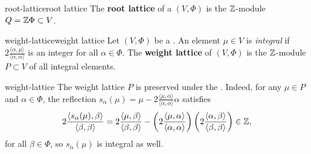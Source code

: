 \begin{topic}{root-lattice}{root lattice}
    The \textbf{root lattice} of a  $(V, \Phi)$ is the $\mathbb{Z}$-module $Q = \mathbb{Z} \Phi \subset V$.
\end{topic}

\begin{topic}{weight-lattice}{weight lattice}
    Let $(V, \Phi)$ be a . An element $\mu \in V$ is \textit{integral} if $2 \frac{\langle \alpha, \mu \rangle}{\langle \alpha, \alpha \rangle}$ is an integer for all $\alpha \in \Phi$. The \textbf{weight lattice} of $(V, \Phi)$ is the $\mathbb{Z}$-module $P \subset V$ of all integral elements.
\end{topic}

\begin{example}{weight-lattice}
    The weight lattice $P$ is preserved under the . Indeed, for any $\mu \in P$ and $\alpha \in \Phi$, the reflection $s_\alpha(\mu) = \mu - 2 \frac{\langle \mu, \alpha \rangle}{\langle \alpha, \alpha \rangle} \alpha$ satisfies
    \[ 2 \frac{\langle s_\alpha(\mu), \beta \rangle}{\langle \beta, \beta \rangle} = 2 \frac{\langle \mu, \beta \rangle}{\langle \beta, \beta \rangle} - \left( 2 \frac{\langle \mu, \alpha \rangle}{\langle \alpha, \alpha \rangle} \right) \left( 2 \frac{\langle \alpha, \beta \rangle}{\langle \beta, \beta \rangle} \right) \in \mathbb{Z} , \]
    for all $\beta \in \Phi$, so $s_\alpha(\mu)$ is integral as well.
\end{example}
